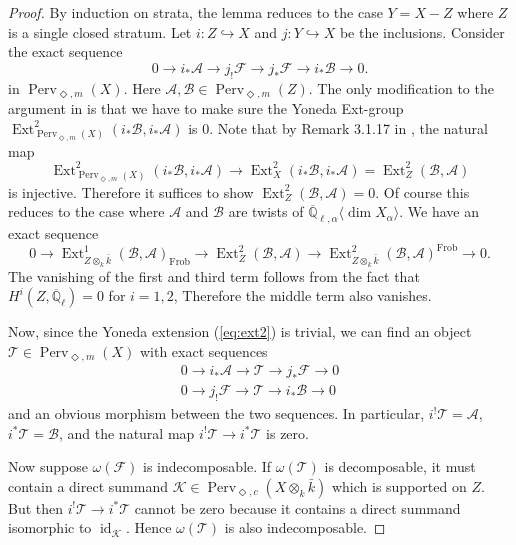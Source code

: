 \documentclass{amsart}
\theoremstyle{plain}
\theoremstyle{definition}
\theoremstyle{remark}
\numberwithin{equation}{subsection}
\begin{document}
\begin{proof}
By induction on strata, the lemma reduces to the case $Y=X-Z$ where $Z$ is a single closed stratum. Let $i:Z\hookrightarrow X$ and $j:Y\hookrightarrow X$ be the inclusions. Consider the exact sequence
\begin{equation}\label{eq:ext2}
0\to i_*{\mathcal{A}}\to j_!{\mathcal{F}}\to j_*{\mathcal{F}}\to i_*{\mathcal{B}}\to0.
\end{equation}
in ${\operatorname{Perv}_{\Diamond,m}({X})}$. Here ${\mathcal{A}},{\mathcal{B}}\in{\operatorname{Perv}_{\Diamond,m}({Z})}$. The only modification to the argument in \cite{BBM} is that we have to make sure the Yoneda Ext-group $\operatorname{Ext}_{{\operatorname{Perv}_{\Diamond,m}({X})}}^2(i_*{\mathcal{B}},i_*{\mathcal{A}})$ is 0. Note that by Remark 3.1.17 in \cite{BBD}, the natural map
\begin{equation*}
\operatorname{Ext}_{{\operatorname{Perv}_{\Diamond,m}({X})}}^2(i_*{\mathcal{B}},i_*{\mathcal{A}})\to\operatorname{Ext}_{X}^2(i_*{\mathcal{B}},i_*{\mathcal{A}})=\operatorname{Ext}_Z^2({\mathcal{B}},{\mathcal{A}})
\end{equation*}
is injective. Therefore it suffices to show $\operatorname{Ext}_Z^2({\mathcal{B}},{\mathcal{A}})=0$. Of course this reduces to the case where ${\mathcal{A}}$ and ${\mathcal{B}}$ are twists of ${\overline{\mathbb{Q}}_{\ell,\alpha}{\langle{{\dim X_\alpha}}\rangle}}$. We have an exact sequence
\begin{equation*}
0\to \operatorname{Ext}_{{{Z}\otimes_k\bar{k}}}^1({\mathcal{B}},{\mathcal{A}})_\operatorname{Frob}\to\operatorname{Ext}_{Z}^2({\mathcal{B}},{\mathcal{A}})\to\operatorname{Ext}_{{{Z}\otimes_k\bar{k}}}^2({\mathcal{B}},{\mathcal{A}})^\operatorname{Frob}\to 0.
\end{equation*}
The vanishing of the first and third term follows from the fact that $H^i(Z,{\overline{\mathbb{Q}}_{\ell}})=0$ for $i=1,2$, Therefore the middle term also vanishes.

Now, since the Yoneda extension (\ref{eq:ext2}) is trivial, we can find an object ${\mathcal{T}}\in{\operatorname{Perv}_{\Diamond,m}({X})}$ with exact sequences
\begin{eqnarray*}
0\to i_*{\mathcal{A}}\to{\mathcal{T}}\to j_*{\mathcal{F}}\to0\\
0\to j_!{\mathcal{F}}\to{\mathcal{T}}\to i_*{\mathcal{B}}\to0
\end{eqnarray*}
and an obvious morphism between the two sequences. In particular, $i^!{\mathcal{T}}={\mathcal{A}}$, $i^*{\mathcal{T}}={\mathcal{B}}$, and the natural map $i^!{\mathcal{T}}\to i^*{\mathcal{T}}$ is zero.

Now suppose $\omega({\mathcal{F}})$ is indecomposable. If $\omega({\mathcal{T}})$ is decomposable, it must contain a direct summand ${\mathcal{K}}\in{\operatorname{Perv}_{\Diamond,c}({{{X}}\otimes_k\bar{k}})}$ which is supported on $Z$. But then $i^!{\mathcal{T}}\to i^*{\mathcal{T}}$ cannot be zero because it contains a direct summand isomorphic to $\operatorname{id}_{\mathcal{K}}$. Hence $\omega({\mathcal{T}})$ is also indecomposable.
\end{proof}
\end{document}
